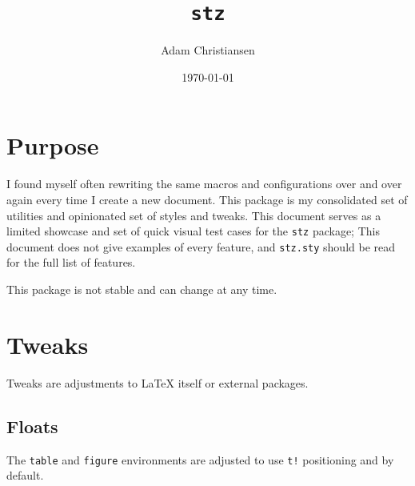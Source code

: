 \documentclass[10pt,titlepage]{article}
\title{\texttt{stz}}
\author{Adam Christiansen}
\date{\today}
\newcommand*{\code}[1]{\texttt{#1}}
\begin{document}
\maketitle
\tableofcontents
\clearpage


\section{Purpose}

I found myself often rewriting the same macros and configurations
over and over again every time I create a new document.
This package is my consolidated set of utilities
and opinionated set of styles and tweaks.
This document serves as a limited showcase
and set of quick visual test cases for the \code{stz} package;
This document does not give examples of every feature,
and \code{stz.sty} should be read for the full list of features.

\begin{caution}
  This package is not stable and can change at any time.
\end{caution}


\section{Tweaks}

Tweaks are adjustments to LaTeX itself or external packages.


\subsection{Floats}

The \code{table} and \code{figure} environments are adjusted to use
\code{t!} positioning and \code{\string\centering} by default.
\end{document}
